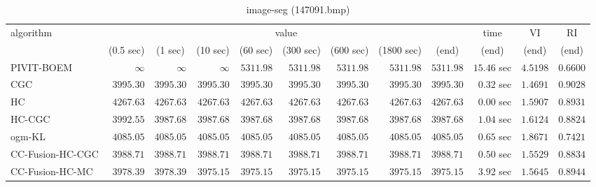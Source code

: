 \begin{table}[H]
\scriptsize
\centering
\caption{image-seg (147091.bmp)}
\label{tab:anytimetable-image-seg-147091.bmp}
\begin{tabular}{lrrrrrrrrrrr}
\toprule
           algorithm &                                   \multicolumn{8}{c}{value} & \multicolumn{1}{c}{time}    & \multicolumn{1}{c}{VI}  & \multicolumn{1}{c}{RI} \\  
\cmidrule(lr){2-9}\cmidrule(lr){10-10} \cmidrule(lr){11-11} \cmidrule(lr){12-12}   
                     & \multicolumn{1}{c}{(0.5 sec)} & \multicolumn{1}{c}{(1 sec)} & \multicolumn{1}{c}{(10 sec)} & \multicolumn{1}{c}{(60 sec)} & \multicolumn{1}{c}{(300 sec)} & \multicolumn{1}{c}{(600 sec)} & \multicolumn{1}{c}{(1800 sec)} & \multicolumn{1}{c}{(end)} & \multicolumn{1}{c}{(end)}    & \multicolumn{1}{c}{(end)}   & \multicolumn{1}{c}{(end)}  \\ \midrule 
          PIVIT-BOEM & $\infty$ & $\infty$ & $\infty$ & $      5311.98$ & $      5311.98$ & $      5311.98$ & $      5311.98$ & $      5311.98$ & $        15.46$ sec    & $       4.5198$  & $       0.6600$ \\ 
                 CGC & $      3995.30$ & $      3995.30$ & $      3995.30$ & $      3995.30$ & $      3995.30$ & $      3995.30$ & $      3995.30$ & $      3995.30$ & $         0.32$ sec    & $       1.4691$  & $       0.9028$ \\ 
                  HC & $      4267.63$ & $      4267.63$ & $      4267.63$ & $      4267.63$ & $      4267.63$ & $      4267.63$ & $      4267.63$ & $      4267.63$ & $         0.00$ sec    & $       1.5907$  & $       0.8931$ \\ 
              HC-CGC & $      3992.55$ & $      3987.68$ & $      3987.68$ & $      3987.68$ & $      3987.68$ & $      3987.68$ & $      3987.68$ & $      3987.68$ & $         1.04$ sec    & $       1.6124$  & $       0.8824$ \\ 
              ogm-KL & $      4085.05$ & $      4085.05$ & $      4085.05$ & $      4085.05$ & $      4085.05$ & $      4085.05$ & $      4085.05$ & $      4085.05$ & $         0.65$ sec    & $       1.8671$  & $       0.7421$ \\ 
    CC-Fusion-HC-CGC & $      3988.71$ & $      3988.71$ & $      3988.71$ & $      3988.71$ & $      3988.71$ & $      3988.71$ & $      3988.71$ & $      3988.71$ & $         0.50$ sec    & $       1.5529$  & $       0.8834$ \\ 
     CC-Fusion-HC-MC & $      3978.39$ & $      3978.39$ & $      3975.15$ & $      3975.15$ & $      3975.15$ & $      3975.15$ & $      3975.15$ & $      3975.15$ & $         3.92$ sec    & $       1.5645$  & $       0.8944$ \\ 

\end{tabular}
\end{table}
